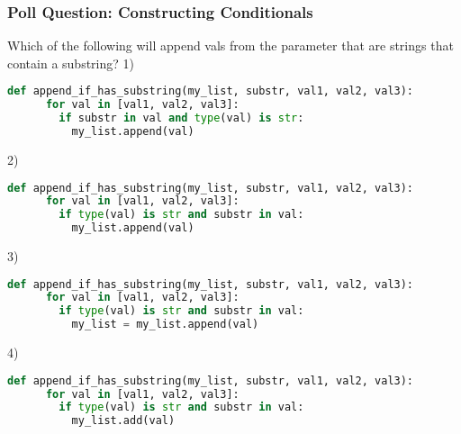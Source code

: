 \documentclass{beamer}
\begin{document}
%
%
\begin{frame}[fragile]
  \frametitle{Poll Question: Constructing Conditionals}
  Which of the following will append vals from the parameter that are strings that contain a substring?
  \tiny
  \vfill
  1)
  \begin{lstlisting}[language=Python, autogobble,basicstyle=\tiny,numbers=none]
    def append_if_has_substring(my_list, substr, val1, val2, val3):
      for val in [val1, val2, val3]:
        if substr in val and type(val) is str:
          my_list.append(val)
  \end{lstlisting}
  \vfill
  2)
  \begin{lstlisting}[language=Python, autogobble,basicstyle=\tiny,numbers=none]
    def append_if_has_substring(my_list, substr, val1, val2, val3):
      for val in [val1, val2, val3]:
        if type(val) is str and substr in val:
          my_list.append(val)
  \end{lstlisting}
  \vfill
  3)
  \begin{lstlisting}[language=Python, autogobble,basicstyle=\tiny,numbers=none]
    def append_if_has_substring(my_list, substr, val1, val2, val3):
      for val in [val1, val2, val3]:
        if type(val) is str and substr in val:
          my_list = my_list.append(val)
  \end{lstlisting}
  \vfill
  4)
  \begin{lstlisting}[language=Python, autogobble,basicstyle=\tiny,numbers=none]
    def append_if_has_substring(my_list, substr, val1, val2, val3):
      for val in [val1, val2, val3]:
        if type(val) is str and substr in val:
          my_list.add(val)
  \end{lstlisting}
\end{frame}
\end{document}
